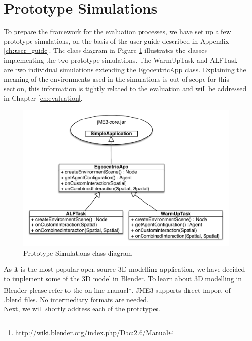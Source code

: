\section{Prototype Simulations} %
\label{sec:impl_prototype_simulations}
To prepare the framework for the evaluation processes, we have set up a few prototype simulations, on the basis of the user guide described in Appendix \ref{ch:user_guide}. The class diagram in Figure \ref{fig:impl_prototype_simulations} illustrates the classes implementing the two prototype simulations. The WarmUpTask and ALFTask are two individual simulations extending the EgocentricApp class. Explaining the meaning of the environments used in the simulations is out of scope for this section, this information is tightly related to the evaluation and will be addressed in Chapter \ref{ch:evaluation}.
\begin{figure}[H]
	\centering
	\includegraphics[width=\linewidth]{gfx/Chapter4/prototype_simulations}
	\caption{Prototype Simulations class diagram}
	\label{fig:impl_prototype_simulations}
\end{figure}

As it is the most popular open source 3D modelling application, we have decided to implement some of the 3D model in Blender. To learn about 3D modelling in Blender please refer to the on-line manual\footnote{\url{http://wiki.blender.org/index.php/Doc:2.6/Manual}}. JME3 supports direct import of .blend files. No intermediary formats are needed.\\

Next, we will shortly address each of the prototypes.
